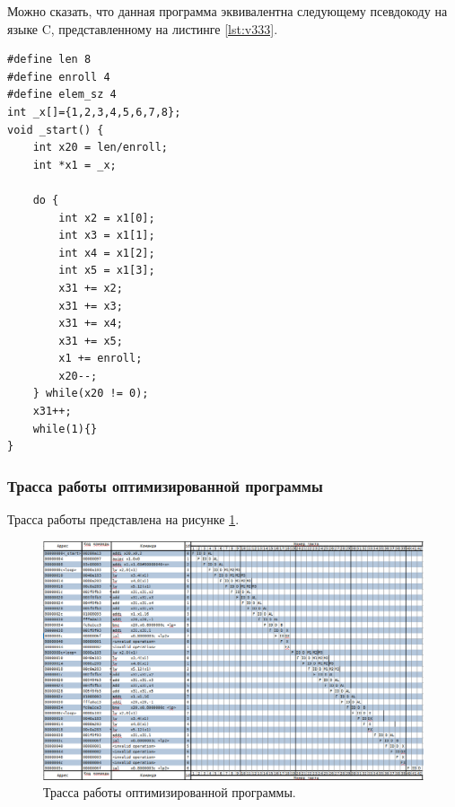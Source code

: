 Можно сказать, что данная программа эквивалентна следующему псевдокоду на языке C, представленному на листинге \ref{lst:v333}.

\begin{lstlisting}[label=lst:v333,caption=Псевдокод программы 9 варинта (оптимизированный)]
#define len 8
#define enroll 4
#define elem_sz 4
int _x[]={1,2,3,4,5,6,7,8};
void _start() {
	int x20 = len/enroll;
	int *x1 = _x;
	
	do {
		int x2 = x1[0];
		int x3 = x1[1];
		int x4 = x1[2];
		int x5 = x1[3];
		x31 += x2;
		x31 += x3;
		x31 += x4;
		x31 += x5;
		x1 += enroll;
		x20--;
	} while(x20 != 0);
	x31++;
	while(1){}
}
\end{lstlisting}

\clearpage

\subsubsection*{Трасса работы оптимизированной программы}
Трасса работы представлена на рисунке \ref{img:t5-trasa-02}.

\begin{figure}[h]
	\centering
	\includegraphics[height=0.4\textheight]{img/t5-trasa-02}
	\caption{Трасса работы оптимизированной программы.}
	\label{img:t5-trasa-02}
\end{figure}

